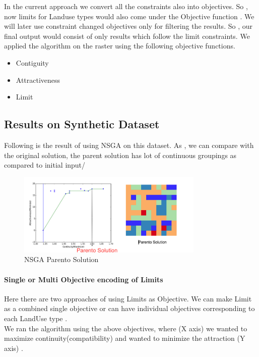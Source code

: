 \documentclass{sig-alternate}
\begin{document}
In the current approach we convert all the constraints also into objectives. So , now limits  for Landuse types would also come under the Objective function . We will later use constraint changed objectives only for filtering the results. So , our final output would consist of only results which follow the limit constraints.
We applied the algorithm  on the raster using the following objective functions. \\
\begin{itemize}
\item Contiguity
\item Attractiveness
\item Limit
\end{itemize}
\subsection{Results on Synthetic Dataset}
Following is the result of using NSGA on this dataset. As , we can compare with the original solution, the parent solution has lot of continuous groupings as compared to initial input/\\ 
\begin{figure}[h]
\begin{center}
\includegraphics[width=3.5in]{res1.png}
\caption{NSGA Parento Solution}
\end{center}
\end{figure}

\paragraph{Single or Multi Objective encoding of Limits\\}

Here there are two approaches of using Limits as Objective. We can make Limit as a combined single objective or can have individual objectives corresponding to each LandUse type . \\
We ran the algorithm using the above objectives, where (X axis) we wanted to maximize continuity(compatibility) and wanted to minimize the attraction (Y axis) .\\
\end{document}
